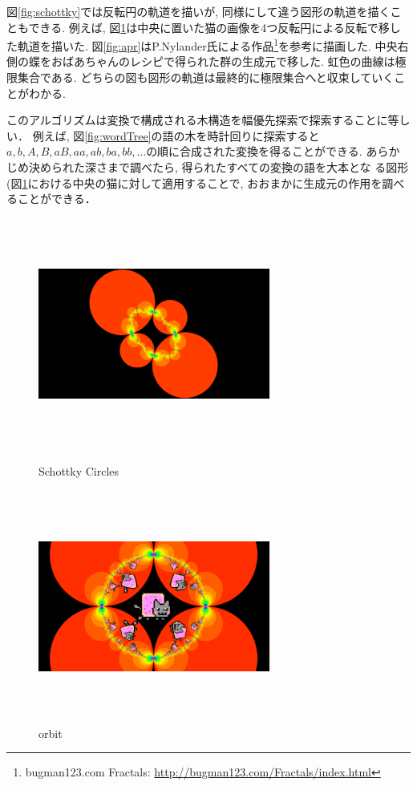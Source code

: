 図\ref{fig:schottky}では反転円の軌道を描いが, 同様にして違う図形の軌道を描くこともできる.
例えば, 図\ref{fig:orbit}は中央に置いた猫の画像を4つ反転円による反転で移した軌道を描いた.
図\ref{fig:apr}はP.Nylander氏による作品\footnote{bugman123.com Fractals:
\url{http://bugman123.com/Fractals/index.html}}を参考に描画した.
中央右側の蝶をおばあちゃんのレシピで得られた群の生成元で移した.
虹色の曲線は極限集合である.
どちらの図も図形の軌道は最終的に極限集合へと収束していくことがわかる.

このアルゴリズムは変換で構成される木構造を幅優先探索で探索することに等しい．
例えば, 図\ref{fig:wordTree}の語の木を時計回りに探索すると$a, b, A, B,
aB, aa, ab, ba, bb, ...$の順に合成された変換を得ることができる.
あらかじめ決められた深さまで調べたら, 得られたすべての変換の語を大本とな
る図形(図\ref{fig:orbit}における中央の猫に対して適用することで, おおまかに生成元の作用を調べることができる．



\begin{figure}[htbp]
 \begin{minipage}{0.49\hsize}
  \begin{center}
   \includegraphics[width=3in, height=3in, keepaspectratio]{../img/klein/schottkyCircles.pdf}
   \caption{Schottky Circles}
   \label{fig:schottky}
  \end{center}
 \end{minipage}
 \begin{minipage}{0.49\hsize}
  \begin{center}
   \includegraphics[width=3in, height=3in, keepaspectratio]{../img/klein/circleOrbit.pdf}
   \caption{orbit}
   \label{fig:orbit}
  \end{center}
 \end{minipage}
\end{figure}



